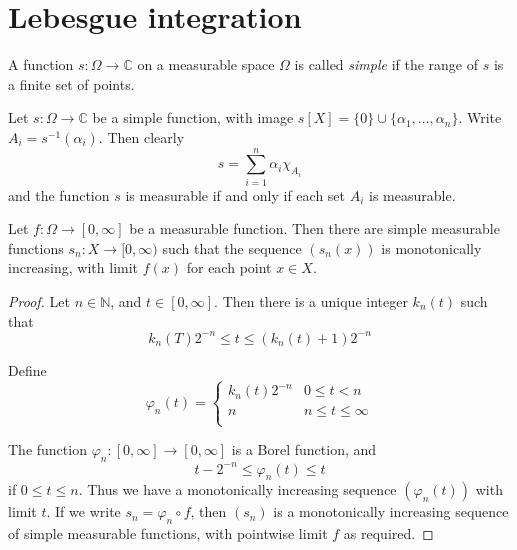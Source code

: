 
\section{Lebesgue integration}\label{sec:lebesgue-integration}


\begin{definition}
A function $s\colon \Omega \rightarrow {\mathbb C}$ on a measurable space $\Omega$ is called {\em simple} if the range of $s$ is a finite set of points.
\end{definition}

Let $s\colon \Omega \rightarrow {\mathbb C}$ be a simple function, with image $s[X] = \{ 0 \} \cup \{ \alpha_1 , \ldots , \alpha_n \}$.  Write $A_i = s^{-1}(\alpha_i )$.  Then clearly
$$s = \sum_{i=1}^n \alpha_i \chi_{A_i}$$
and the function $s$ is measurable if and only if each set $A_i$ is measurable.

\begin{proposition} \label{simpapp}
Let $f\colon \Omega \rightarrow [0,\infty ]$ be a measurable function.  Then there are simple measurable functions $s_n \colon X\rightarrow [0,\infty )$ such that the sequence $(s_n (x))$ is monotonically increasing, with limit $f(x)$ for each point $x\in X$.
\end{proposition}

\begin{proof}
Let $n\in {\mathbb N}$, and $t\in [0,\infty ]$.  Then there is a unique integer $k_n (t)$ such that
$$k_n (T) 2^{-n} \leq t \leq (k_n (t) +1)2^{-n}$$

Define
$$\varphi_n (t) = \left\{ \begin{array}{ll}
k_n (t)2^{-n} & 0\leq t< n \\
n & n\leq t\leq \infty \\
\end{array} \right.$$

The function $\varphi_n \colon [0,\infty ]\rightarrow [0,\infty ]$ is a Borel function, and
$$t-2^{-n} \leq \varphi_n (t) \leq t$$
if $0\leq t\leq n$.  Thus we have a monotonically increasing sequence $(\varphi_n (t))$ with limit $t$.  If we write $s_n = \varphi_n \circ f$, then $(s_n)$ is a monotonically increasing sequence of simple measurable functions, with pointwise limit $f$ as required.
\end{proof}

